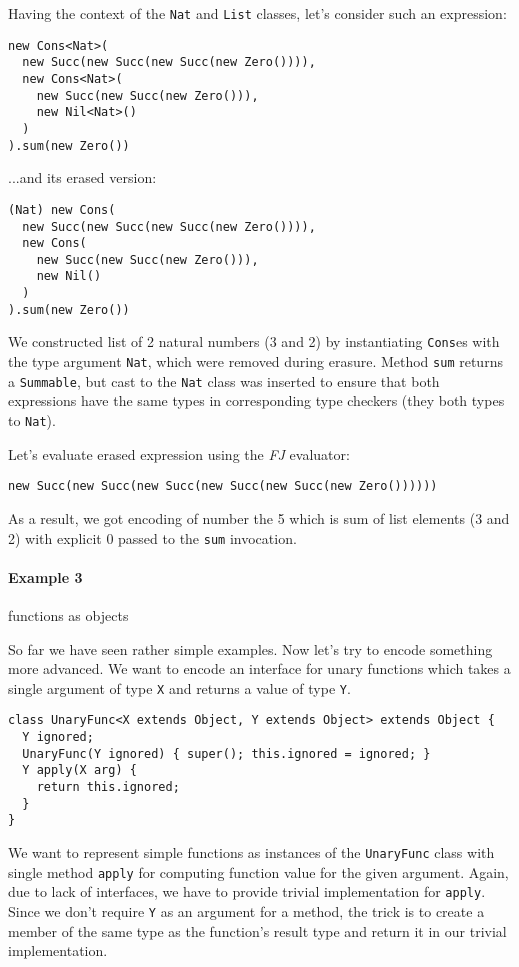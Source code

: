 \documentclass{article}[12pt]
\begin{document}
Having the context of the \texttt{Nat} and \texttt{List} classes,
let's consider such an expression:

\begin{verbatim}
new Cons<Nat>(
  new Succ(new Succ(new Succ(new Zero()))),
  new Cons<Nat>(
    new Succ(new Succ(new Zero())),
    new Nil<Nat>()
  )
).sum(new Zero())
\end{verbatim}
...and its erased version:
\begin{verbatim}
(Nat) new Cons(
  new Succ(new Succ(new Succ(new Zero()))),
  new Cons(
    new Succ(new Succ(new Zero())),
    new Nil()
  )
).sum(new Zero())
\end{verbatim}
We constructed list of 2 natural numbers
(3 and 2) by instantiating \texttt{Cons}es with the type argument
\texttt{Nat}, which were removed during erasure. Method
\texttt{sum} returns a \texttt{Summable}, but cast to the
\texttt{Nat} class was inserted to ensure that both expressions have
the same types in corresponding type checkers (they both types
to \texttt{Nat}).

Let's evaluate erased expression using the \emph{FJ} evaluator:

\begin{verbatim}
new Succ(new Succ(new Succ(new Succ(new Succ(new Zero())))))
\end{verbatim}
As a result, we got encoding of number the 5 which is sum of list
elements (3 and 2) with explicit 0 passed to the \texttt{sum}
invocation.

\paragraph{Example 3} functions as objects

So far we have seen rather simple examples. Now let's try to
encode something more advanced.
We want to encode an interface for unary functions which takes
a single argument of type \texttt{X} and returns a value
of type \texttt{Y}.

\begin{verbatim}
class UnaryFunc<X extends Object, Y extends Object> extends Object {
  Y ignored;
  UnaryFunc(Y ignored) { super(); this.ignored = ignored; }
  Y apply(X arg) {
    return this.ignored;
  }
}
\end{verbatim}
We want to represent simple functions as instances of the
\texttt{UnaryFunc} class with single method \texttt{apply} for
computing function value for the given argument. Again, due to lack
of interfaces, we have to provide trivial implementation for
\texttt{apply}. Since we don't require \texttt{Y} as an argument
for a method, the trick is to create a member of the same type as
the function's result type and return it in our trivial implementation.
\end{document}
